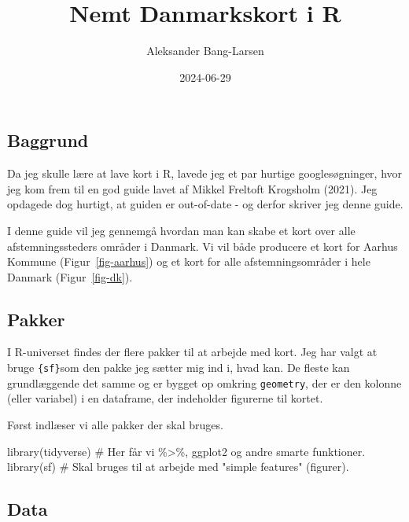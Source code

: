\documentclass[
  a4paper,
  DIV=11,
  numbers=noendperiod,
  oneside]{scrartcl}
\title{Nemt Danmarkskort i R}
\author{Aleksander Bang-Larsen}
\date{2024-06-29}
\newenvironment{Shaded}{\begin{snugshade}}{\end{snugshade}}
\newcommand{\CommentTok}[1]{\textcolor[rgb]{0.37,0.37,0.37}{#1}}
\newcommand{\FunctionTok}[1]{\textcolor[rgb]{0.28,0.35,0.67}{#1}}
\newcommand{\NormalTok}[1]{\textcolor[rgb]{0.00,0.23,0.31}{#1}}
\renewcommand*\contentsname{Indholdsfortegnelse}
\newcommand\contentsname{Indholdsfortegnelse}
\begin{document}
\maketitle

\renewcommand*\contentsname{Indholdsfortegnelse}
{
\hypersetup{linkcolor=}
\setcounter{tocdepth}{3}
\tableofcontents
}

\subsection{Baggrund}\label{baggrund}

Da jeg skulle lære at lave kort i R, lavede jeg et par hurtige
googlesøgninger, hvor jeg kom frem til en god guide lavet af Mikkel
Freltoft Krogsholm (2021). Jeg opdagede dog hurtigt, at guiden er
out-of-date - og derfor skriver jeg denne guide.

I denne guide vil jeg gennemgå hvordan man kan skabe et kort over alle
afstemningssteders områder i Danmark. Vi vil både producere et kort for
Aarhus Kommune (Figur~\ref{fig-aarhus}) og et kort for alle
afstemningsområder i hele Danmark (Figur~\ref{fig-dk}).

\subsection{Pakker}\label{pakker}

I R-universet findes der flere pakker til at arbejde med kort. Jeg har
valgt at bruge \texttt{\{sf\}}som den pakke jeg sætter mig ind i, hvad
kan. De fleste kan grundlæggende det samme og er bygget op omkring
\texttt{geometry}, der er den kolonne (eller variabel) i en dataframe,
der indeholder figurerne til kortet.

Først indlæser vi alle pakker der skal bruges.

\begin{Shaded}
\begin{Highlighting}[]
\FunctionTok{library}\NormalTok{(tidyverse)      }\CommentTok{\# Her får vi \%\textgreater{}\%, ggplot2 og andre smarte funktioner.}
\FunctionTok{library}\NormalTok{(sf)             }\CommentTok{\# Skal bruges til at arbejde med "simple features" (figurer).}
\end{Highlighting}
\end{Shaded}

\subsection{Data}\label{data}
\end{document}
